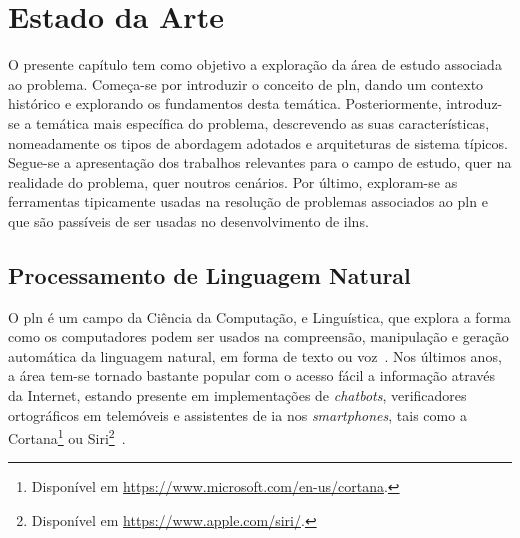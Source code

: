 \chapter{Estado da Arte}
\label{chap:Chapter3}
O presente capítulo tem como objetivo a exploração da área de estudo associada ao problema. Começa-se por introduzir o conceito de \gls{pln}, dando um contexto histórico e explorando os fundamentos desta temática. Posteriormente, introduz-se a temática mais específica do problema, descrevendo as suas características, nomeadamente os tipos de abordagem adotados e arquiteturas de sistema típicos. Segue-se a apresentação dos trabalhos relevantes para o campo de estudo, quer na realidade do problema, quer noutros cenários. Por último, exploram-se as ferramentas tipicamente usadas na resolução de problemas associados ao \gls{pln} e que são passíveis de ser usadas no desenvolvimento de \glspl{iln}.

\section{Processamento de Linguagem Natural}
\label{sec:chap03_pln}
O \gls{pln} é um campo da Ciência da Computação,  e Linguística, que explora a forma como os computadores podem ser usados na compreensão, manipulação e geração automática da linguagem natural, em forma de texto ou voz~\parencite{nlp, applied_natural_language_processing_with_python, pln_extracao_conhecimento}. Nos últimos anos, a área tem-se tornado bastante popular com o acesso fácil a informação através da Internet, estando presente em implementações de \textit{chatbots}, verificadores ortográficos em telemóveis e assistentes de \gls{ia} nos \textit{smartphones}, tais como a Cortana\footnote{Disponível em \url{https://www.microsoft.com/en-us/cortana}.} ou Siri\footnote{Disponível em \url{https://www.apple.com/siri/}.}~\parencite{pln_extracao_conhecimento, applied_natural_language_processing_with_python}. 

